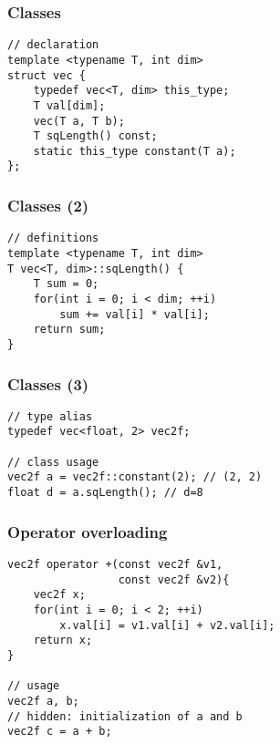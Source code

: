 
\begin{frame}
\end{frame}


\begin{frame}[fragile]
\frametitle{Classes}
\begin{lstlisting}
// declaration
template <typename T, int dim>
struct vec {
    typedef vec<T, dim> this_type;
    T val[dim];
    vec(T a, T b);
    T sqLength() const;
    static this_type constant(T a);
};
\end{lstlisting}
\end{frame}

\begin{frame}[fragile]
\frametitle{Classes (2)}
\begin{lstlisting}
// definitions
template <typename T, int dim>
T vec<T, dim>::sqLength() {
    T sum = 0;
    for(int i = 0; i < dim; ++i)
        sum += val[i] * val[i];
    return sum;
}
\end{lstlisting}
\end{frame}

\begin{frame}[fragile]
\frametitle{Classes (3)}
\begin{lstlisting}
// type alias
typedef vec<float, 2> vec2f;

// class usage
vec2f a = vec2f::constant(2); // (2, 2)
float d = a.sqLength(); // d=8
\end{lstlisting}
\end{frame}

\begin{frame}[fragile]
\frametitle{Operator overloading}
\begin{lstlisting}
vec2f operator +(const vec2f &v1,
                 const vec2f &v2){
    vec2f x;
    for(int i = 0; i < 2; ++i)
        x.val[i] = v1.val[i] + v2.val[i];
    return x;
}

// usage
vec2f a, b;
// hidden: initialization of a and b
vec2f c = a + b;
\end{lstlisting}
\end{frame}
